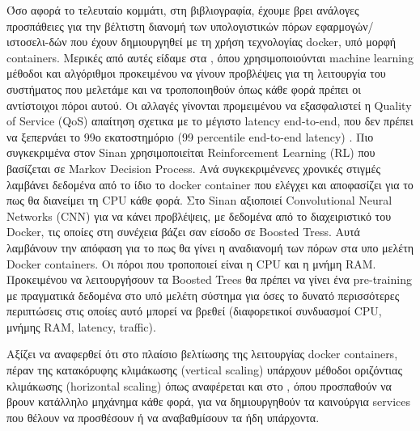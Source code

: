 Όσο αφορά το τελευταίο κομμάτι, στη βιβλιογραφία, έχουμε βρει ανάλογες προσπάθειες για την βέλτιστη διανομή των υπολογιστικών πόρων εφαρμογών/ιστοσελι-δών που έχουν δημιουργηθεί με τη χρήση τεχνολογίας docker, υπό μορφή containers. Μερικές από αυτές είδαμε στα \cite{sinan}, \cite{reclaimer} όπου χρησιμοποιούνται machine learning μέθοδοι και αλγόριθμοι προκειμένου να γίνουν προβλέψεις για τη λειτουργία του συστήματος που μελετάμε και να τροποποιηθούν όπως κάθε φορά πρέπει οι αντίστοιχοι πόροι αυτού. Οι αλλαγές γίνονται προμειμένου να εξασφαλιστεί η Quality of Service (QoS) απαίτηση σχετικα με το μέγιστο latency end-to-end, που δεν πρέπει να ξεπερνάει το 99ο εκατοστημόριο (99 percentile end-to-end latency) \cite{qos_1} \cite{qos_2}. Πιο συγκεκριμένα στον Sinan \cite{reclaimer} χρησιμοποιείται Reinforcement Learning (RL) που βασίζεται σε Markov Decision Process. Ανά συγκεκριμένενες χρονικές στιγμές λαμβάνει δεδομένα από το ίδιο το docker container που ελέγχει και αποφασίζει για το πως θα διανείμει τη CPU κάθε φορά. Στο Sinan \cite{sinan} αξιοποιεί Convolutional Neural Networks (CNN) για να κάνει προβλέψεις, με δεδομένα από το διαχειριστικό του Docker, τις οποίες στη συνέχεια βάζει σαν είσοδο σε Boosted Tress. Αυτά λαμβάνουν την απόφαση για το πως θα γίνει η αναδιανομή των πόρων στα υπο μελέτη Docker containers. Οι πόροι που τροποποιεί είναι η CPU και η μνήμη RAM. Προκειμένου να λειτουργήσουν τα Boosted Trees θα πρέπει να γίνει ένα pre-training με πραγματικά δεδομένα στο υπό μελέτη σύστημα για όσες το δυνατό περισσότερες περιπτώσεις στις οποίες αυτό μπορεί να βρεθεί (διαφορετικοί συνδυασμοί CPU, μνήμης RAM, latency, traffic). 

Αξίζει να αναφερθεί ότι στο πλαίσιο βελτίωσης της λειτουργίας docker containers, πέραν της κατακόρυφης κλιμάκωσης (vertical scaling) υπάρχουν μέθοδοι οριζόντιας κλιμάκωσης (horizontal scaling) όπως αναφέρεται και στο \cite{dynamic_resource_allocation}, όπου προσπαθούν να βρουν κατάλληλο μηχάνημα κάθε φορά, για να δημιουργηθούν τα καινούργια services που θέλουν να προσθέσουν ή να αναβαθμίσουν τα ήδη υπάρχοντα. 

